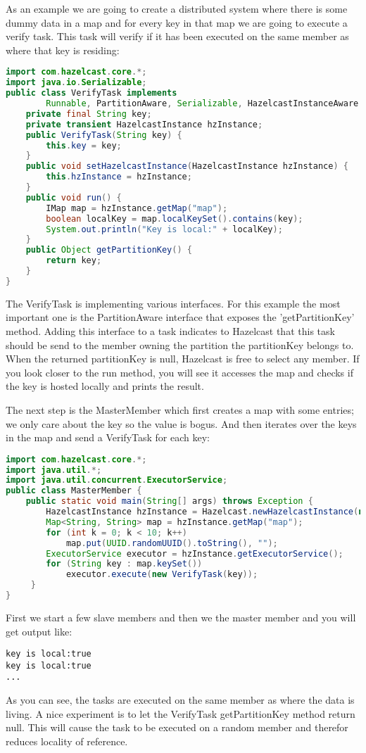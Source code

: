 As an example we are going to create a distributed system where there is some dummy data in a map and for every key in that map we are going to execute a verify task. This task will verify if it has been executed on the same member as where that key is residing:
\begin{lstlisting}[language=java]
import com.hazelcast.core.*;
import java.io.Serializable;
public class VerifyTask implements
        Runnable, PartitionAware, Serializable, HazelcastInstanceAware {
    private final String key;
    private transient HazelcastInstance hzInstance;
    public VerifyTask(String key) {
        this.key = key;
    }
    public void setHazelcastInstance(HazelcastInstance hzInstance) {
        this.hzInstance = hzInstance;
    }
    public void run() {
        IMap map = hzInstance.getMap("map");
        boolean localKey = map.localKeySet().contains(key);
        System.out.println("Key is local:" + localKey);
    }
    public Object getPartitionKey() {
        return key;
    }
}
\end{lstlisting}
The VerifyTask is implementing various interfaces. For this example the most important one is the PartitionAware interface that exposes the 'getPartitionKey' method. Adding this interface to a task indicates to Hazelcast that this task should be send to the member owning the partition the partitionKey belongs to. When the returned partitionKey is null, Hazelcast is free to select any member. If you look closer to the run method, you will see it accesses the map and checks if the key is hosted locally and prints the result.

The next step is the MasterMember which first creates a map with some entries; we only care about the key so the value is bogus. And then iterates over the keys in the map and send a VerifyTask for each key:
\begin{lstlisting}[language=java]
import com.hazelcast.core.*;
import java.util.*;
import java.util.concurrent.ExecutorService;
public class MasterMember {
    public static void main(String[] args) throws Exception {
        HazelcastInstance hzInstance = Hazelcast.newHazelcastInstance(null);
        Map<String, String> map = hzInstance.getMap("map");
        for (int k = 0; k < 10; k++) 
            map.put(UUID.randomUUID().toString(), "");
        ExecutorService executor = hzInstance.getExecutorService();
        for (String key : map.keySet()) 
            executor.execute(new VerifyTask(key));
     }
}
\end{lstlisting}
First we start a few slave members and then we the master member and you will get output like:
\begin{lstlisting}
key is local:true
key is local:true
...
\end{lstlisting}
As you can see, the tasks are executed on the same member as where the data is living. A nice experiment is to let the VerifyTask getPartitionKey method return null. This will cause the task to be executed on a random member and therefor reduces locality of reference.

